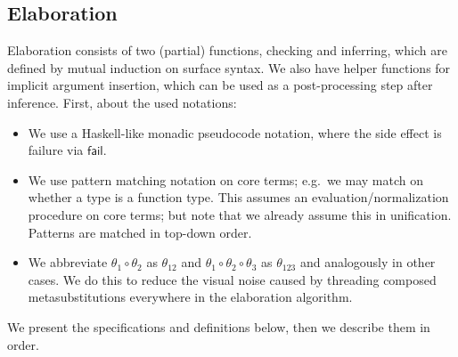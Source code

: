 \documentclass[acmsmall,screen,dvipsnames]{acmart}\settopmatter{}
\newcommand{\fail}{\mathsf{fail}}
\theoremstyle{remark}
\begin{document}
\subsection{Elaboration}
\label{sec:elaboration}

Elaboration consists of two (partial) functions, checking and inferring, which
are defined by mutual induction on surface syntax. We also have helper functions
for implicit argument insertion, which can be used as a post-processing step
after inference. First, about the used notations:
\begin{itemize}
  \item We use a Haskell-like monadic pseudocode notation, where the side effect is
    failure via $\fail$.
  \item We use pattern matching notation on core terms; e.g.\ we may match on
    whether a type is a function type. This assumes an evaluation/normalization
    procedure on core terms; but note that we already assume this in
    unification. Patterns are matched in top-down order.
  \item We abbreviate $\theta_1 \circ \theta_2$ as $\theta_{12}$ and $\theta_1
    \circ \theta_2 \circ \theta_3$ as $\theta_{123}$ and analogously in other
    cases. We do this to reduce the visual noise caused by threading composed
    metasubstitutions everywhere in the elaboration algorithm.
\end{itemize}
We present the specifications and definitions below, then we describe them in order.
\end{document}
